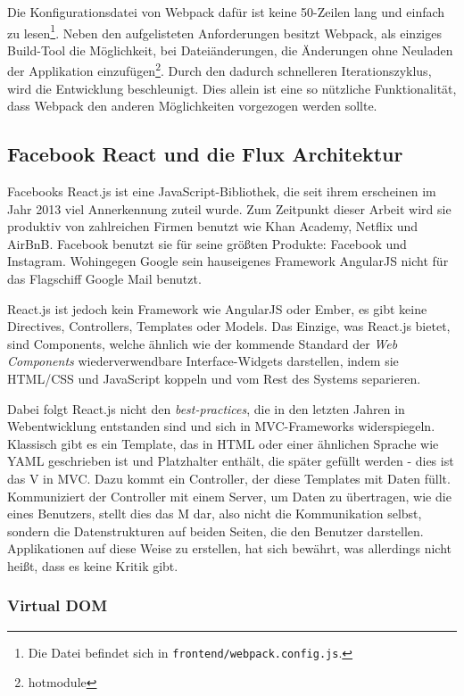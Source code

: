 \documentclass[12pt,twoside]{book}
\begin{document}
Die Konfigurationsdatei von Webpack dafür ist keine 50-Zeilen lang und einfach zu lesen\footnote{Die Datei befindet sich in \texttt{frontend/webpack.config.js}.}. Neben den aufgelisteten Anforderungen besitzt Webpack, als einziges Build-Tool die Möglichkeit, bei Dateiänderungen, die Änderungen ohne Neuladen der Applikation einzufügen\footnote{hotmodule}. Durch den dadurch schnelleren Iterationszyklus, wird die Entwicklung beschleunigt. Dies allein ist eine so nützliche Funktionalität, dass Webpack  den anderen Möglichkeiten vorgezogen werden sollte.

\subsection{Facebook React und die Flux Architektur}\label{sec:flux}

Facebooks React.js ist eine JavaScript-Bibliothek, die seit ihrem erscheinen im Jahr 2013 viel Annerkennung zuteil wurde. Zum Zeitpunkt dieser Arbeit wird sie produktiv von zahlreichen Firmen benutzt wie Khan Academy\cite{khan}, Netflix\cite{netflix} und AirBnB\cite{airbnb}. Facebook benutzt sie für seine größten Produkte: Facebook und Instagram. Wohingegen Google sein hauseigenes Framework AngularJS nicht für das Flagschiff Google Mail benutzt.

React.js ist jedoch kein Framework wie AngularJS oder Ember, es gibt keine Directives, Controllers, Templates oder Models. Das Einzige, was React.js bietet, sind Components, welche ähnlich wie der kommende Standard der \textit{Web Components} \cite{webcomponents} wiederverwendbare Interface-Widgets darstellen, indem sie HTML/CSS und JavaScript koppeln und vom Rest des Systems separieren.

Dabei folgt React.js nicht den \textit{best-practices}, die in den letzten Jahren in Webentwicklung entstanden sind und sich in MVC-Frameworks widerspiegeln. Klassisch gibt es ein Template, das in HTML oder einer ähnlichen Sprache wie YAML geschrieben ist und Platzhalter enthält, die später gefüllt werden - dies ist das V in MVC.
Dazu kommt ein Controller, der diese Templates mit Daten füllt. Kommuniziert der Controller mit einem Server, um Daten zu übertragen, wie die eines Benutzers, stellt dies das M dar, also nicht die Kommunikation selbst, sondern die Datenstrukturen auf beiden Seiten, die den Benutzer darstellen.
Applikationen auf diese Weise zu erstellen, hat sich bewährt, was allerdings nicht heißt, dass es keine Kritik gibt.

\subsubsection*{Virtual DOM}
\end{document}
